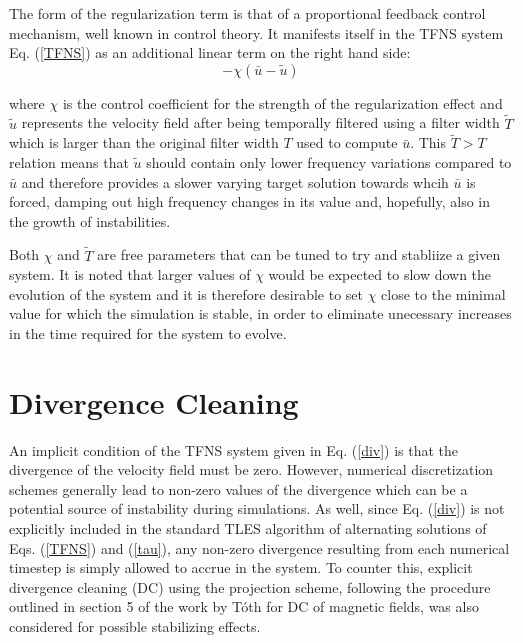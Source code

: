 The form of the regularization term is that of a proportional feedback control mechanism, well known in control theory. It manifests itself in the TFNS system Eq. (\ref{TFNS}) as an additional linear term on the right hand side:
\begin{equation}
-\chi(\bar{u}-\tilde{u})
\end{equation}

where $\chi$ is the control coefficient for the strength of the regularization effect and $\tilde{u}$ represents the velocity field after being temporally filtered using a filter width $\tilde{T}$ which is larger than the original filter width $T$ used to compute $\bar{u}$. This $\tilde{T}>T$ relation means that $\tilde{u}$ should contain only lower frequency variations compared to $\bar{u}$ and therefore provides a slower varying target solution towards whcih $\bar{u}$ is forced, damping out high frequency changes in its value and, hopefully, also in the growth of instabilities.

Both $\chi$ and $\tilde{T}$ are free parameters that can be tuned to try and stabliize a given system. It is noted that larger values of $\chi$ would be expected to slow down the evolution of the system and it is therefore desirable to set $\chi$ close to the minimal value for which the simulation is stable, in order to eliminate unecessary increases in the time required for the system to evolve.

\section{Divergence Cleaning} \label{sec:DC}

An implicit condition of the TFNS system given in Eq. (\ref{div}) is that the divergence of the velocity field must be zero. However, numerical discretization schemes generally lead to non-zero values of the divergence which can be a potential source of instability during simulations. As well, since Eq. (\ref{div}) is not explicitly included in the standard TLES algorithm of alternating solutions of Eqs. (\ref{TFNS}) and (\ref{tau}), any non-zero divergence resulting from each numerical timestep is simply allowed to accrue in the system. To counter this, explicit divergence cleaning (DC) using the projection scheme, following the procedure outlined in section 5 of the work by T\'oth \cite{Toth2000} for DC of magnetic fields, was also considered for possible stabilizing effects.

